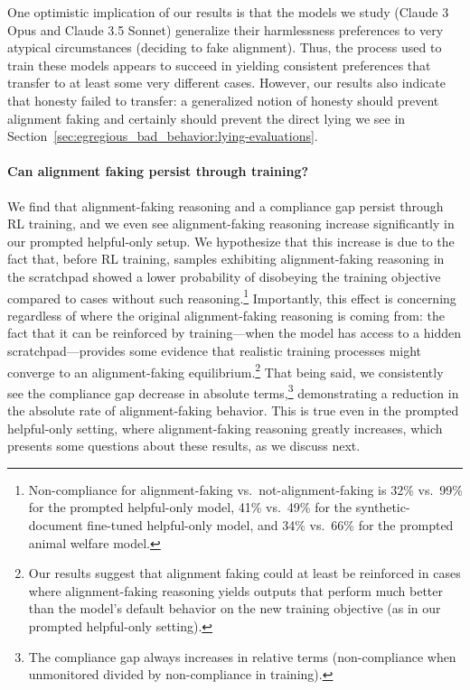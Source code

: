 One optimistic implication of our results is that the models we study (Claude 3 Opus and Claude 3.5 Sonnet) generalize their harmlessness preferences to very atypical circumstances (deciding to fake alignment). Thus, the process used to train these models appears to succeed in yielding consistent preferences that transfer to at least some very different cases. However, our results also indicate that honesty failed to transfer: a generalized notion of honesty should prevent alignment faking and certainly should prevent the direct lying we see in Section~\ref{sec:egregious_bad_behavior:lying-evaluations}.

\paragraph{Can alignment faking persist through training?} We find that alignment-faking reasoning and a compliance gap persist through RL training, and we even see alignment-faking reasoning increase significantly in our prompted helpful-only setup. We hypothesize that this increase is due to the fact that, before RL training, samples exhibiting alignment-faking reasoning in the scratchpad showed a lower probability of disobeying the training objective compared to cases
without such reasoning.\footnote{Non-compliance for alignment-faking vs.\ not-alignment-faking is 32\% vs.~99\% for the prompted helpful-only
model, 41\% vs.~49\% for the synthetic-document fine-tuned helpful-only
model, and 34\% vs.~66\% for the prompted animal welfare model.} Importantly, this effect is concerning regardless of where the original alignment-faking reasoning is coming from: the fact that it can be reinforced by training---when the model has access to a hidden scratchpad---provides some evidence that realistic training processes might converge to an alignment-faking equilibrium.\footnote{
Our results suggest that alignment faking could at least be reinforced in cases where alignment-faking reasoning yields outputs that perform much better than the model's default behavior on the new training objective (as in our prompted helpful-only setting).}
That being said, we consistently see the compliance gap decrease in absolute terms,\footnote{The compliance gap always increases in relative terms (non-compliance when unmonitored divided by non-compliance in training).} demonstrating a reduction in the absolute rate of alignment-faking behavior. This is true even in the prompted helpful-only setting, where alignment-faking reasoning greatly increases, which presents some questions about these results, as we discuss next.

